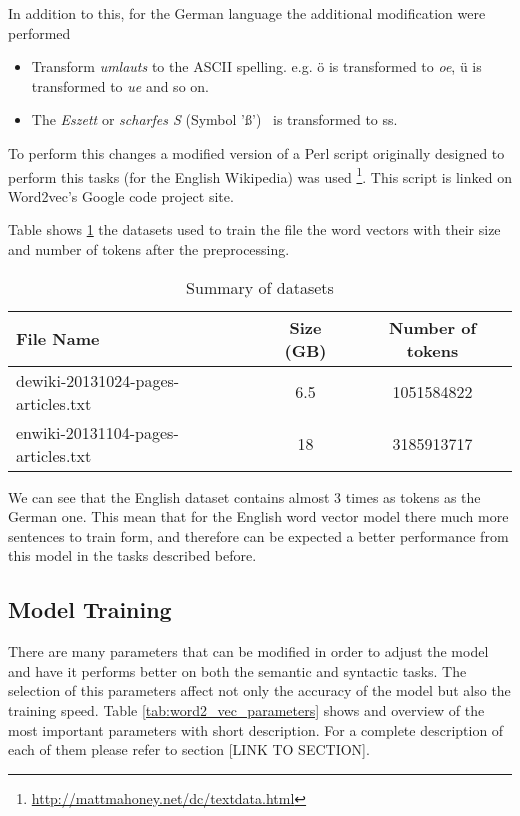 In addition to this, for the German language the additional modification were
performed
\begin{itemize}
\item Transform \textit{umlauts} to the ASCII spelling.  e.g. \"{o} is
  transformed to \textit{oe},  \"{u} is transformed to \textit{ue}  and so
  on. 
\item The \textit{Eszett} or \textit{scharfes S} (Symbol '\ss') \  is transformed to ss.
\end{itemize}


To perform this changes a modified version of a Perl script originally
designed to perform this tasks (for the English Wikipedia) was used
\footnote{\url{http://mattmahoney.net/dc/textdata.html}}. This script is
linked on Word2vec's Google code project site.

Table shows \ref{tab:summ_dataset_germanword2vec} the datasets used
to train the file the word vectors with their size and number of tokens after
the preprocessing. 
  

 \begin{table}[h]

   \centering
   
   \caption{Summary of datasets} 
   \label{tab:summ_dataset_germanword2vec}
   \small
   \begin{tabular}{ |l|c|c| }
   \hline           
    File Name &  Size (GB) & Number of tokens  \\  \hline           
    dewiki-20131024-pages-articles.txt & 6.5 &   1051584822 \\ 
    enwiki-20131104-pages-articles.txt & 18 &  3185913717  \\
    \hline

\end{tabular}
\end{table}

  

We can see that the English dataset contains almost 3 times as tokens as the
German one. This mean that for the English word vector model  there much more
sentences to train form, and therefore can be expected a better performance
from this model in the tasks described before. 
   
\subsection{Model Training}
\label{experiments:sub:Training}

There are many parameters that can be modified in order to adjust the model
and have it performs better on both the  semantic and syntactic tasks. The
selection of this parameters affect not only the accuracy of the model but
also the training speed.  Table \ref{tab:word2_vec_parameters} shows and
overview of the most important parameters with short description. For a
complete description of each of them please refer to section [LINK TO SECTION]. 



